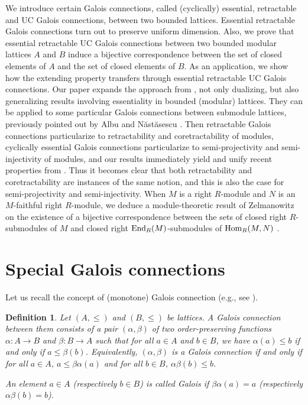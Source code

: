 \documentclass[11pt,a4paper]{amsart}
\newtheorem{defn}[theorem]{Definition}
\begin{document}
We introduce certain Galois connections, called (cyclically) essential, retractable and UC
Galois connections, between two bounded lattices. Essential retractable Galois connections turn out to
preserve uniform dimension. Also, we prove that essential retractable UC Galois connections between
two bounded modular lattices $A$ and $B$ induce a bijective correspondence between the set of closed elements of $A$ and
the set of closed elements of $B$. As an application, we show how the extending property transfers through
essential retractable UC Galois connections. Our paper expands the approach from \cite{CIKO}, not only dualizing, but
also generalizing results involving essentiality in bounded (modular) lattices. They can be applied to some
particular Galois connections between submodule lattices, previously pointed out by Albu and N\u ast\u asescu
\cite[pp.~25-26]{AN}. Then retractable Galois connections particularize to retractability and
coretractability of modules, cyclically essential Galois connections particularize to semi-projectivity and
semi-injectivity of modules, and our results immediately yield and unify recent properties from \cite{AES,HV}.
Thus it becomes clear that both retractability and coretractability are instances of the same notion, and
this is also the case for semi-projectivity and semi-injectivity. When $M$ is a right $R$-module and $N$ is an
$M$-faithful right $R$-module, we deduce a module-theoretic result of Zelmanowitz on the existence of a
bijective correspondence between the sets of closed right $R$-submodules of $M$ and closed right ${\rm
End}_R(M)$-submodules of ${{\rm Hom}}_R(M,N)$ \cite[Theorem~1.2]{Z}. 

\section{Special Galois connections}

Let us recall the concept of (monotone) Galois connection (e.g., see \cite{Erne}). 

\begin{defn} \rm Let $(A,\leq)$ and $(B,\leq)$ be lattices. A {\it Galois connection} between them consists of a
pair $(\alpha, \beta)$ of two order-preserving functions $\alpha:A\to B$ and $\beta:B\to A$ such that for all $a\in
A$ and $b\in B$, we have $\alpha(a)\leq b$ if and only if $a\leq \beta(b)$. Equivalently, $(\alpha,\beta)$ is a Galois
connection if and only if for all $a\in A$, $a\leq \beta\alpha(a)$ and for all $b\in B$, $\alpha\beta(b)\leq b$. 

An element $a\in A$ (respectively $b\in B$) is called \emph{Galois} if $\beta\alpha(a)=a$ (respectively
$\alpha\beta(b)=b$). 
\end{defn}
\end{document}
